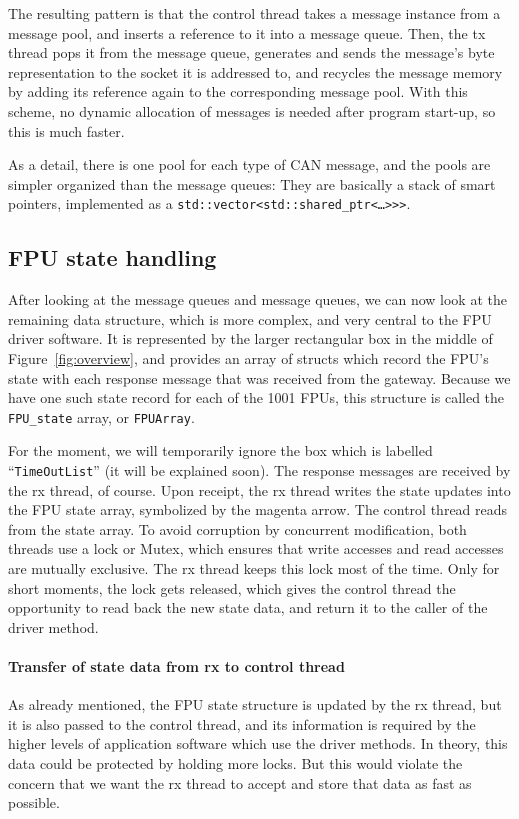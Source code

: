 \documentclass[fontsize=12,a4paper]{scrartcl}
\begin{document}
The resulting pattern is that the control thread takes a message
instance from a message pool, and inserts a reference to it into a
message queue. Then, the tx thread pops it from the message queue,
generates and sends the message's byte representation to the socket it
is addressed to, and recycles the message memory by adding its
reference again to the corresponding message pool. With this scheme,
no dynamic allocation of messages is needed after program start-up, so
this is much faster.

As a detail, there is one pool for each type of CAN message, and the
pools are simpler organized than the message queues: They are
basically a stack of smart pointers, implemented as a
\texttt{std::vector<std::shared\_ptr<\ldots>>>}.

\subsection{FPU state handling}

After looking at the message queues and message queues, we can now
look at the remaining data structure, which is more complex, and very
central to the FPU driver software. It is represented by the larger
rectangular box in the middle of Figure~\ref{fig:overview}, and
provides an array of structs which record the FPU's state with each
response message that was received from the gateway. Because we have
one such state record for each of the 1001 FPUs, this structure is
called the \texttt{FPU\_state} array, or \texttt{FPUArray}.

For the moment, we will temporarily ignore the box which is labelled
``\texttt{TimeOutList}'' (it will be explained soon).  The response
messages are received by the rx thread, of course.  Upon receipt, the
rx thread writes the state updates into the FPU state array,
symbolized by the magenta arrow. The control thread reads from the
state array. To avoid corruption by concurrent modification, both
threads use a lock or Mutex, which ensures that write accesses and
read accesses are mutually exclusive. The rx thread keeps this lock
most of the time. Only for short moments, the lock gets released,
which gives the control thread the opportunity to read back the new
state data, and return it to the caller of the driver method.

\paragraph{Transfer of state data from rx to control thread}
As already mentioned, the FPU state structure is updated by the rx
thread, but it is also passed to the control thread, and its
information is required by the higher levels of application software
which use the driver methods. In theory, this data could be protected
by holding more locks. But this would violate the concern that we want
the rx thread to accept and store that data as fast as possible.
\end{document}
